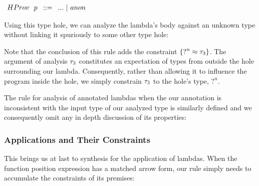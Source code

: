 \begin{center}
    $\arraycolsep=4pt\begin{array}{lll}
    HProv~~ p & ::= & 
        ... ~\vert~ 
        anon
        \\
    \end{array}$
\end{center}
Using this type hole, we can analyze the lambda's body against an unknown type without linking it spuriously to some other type hole:

\begin{mathpar}
\end{mathpar}
Note that the conclusion of this rule adds the constraint $\{ \TUnknown^{n} \approx \TMV_3 \}$. The argument of analysis $\TMV_3$ constitutes an expectation of types from outside the hole surrounding our lambda. Consequently, rather than allowing it to influence the program inside the hole, we simply constrain $\TMV_3$ to the hole's type, $?^n$.

The rule for analysis of annotated lambdas when the our annotation is inconsistent with the input type of our analyzed type is similarly defined and we consequently omit any in depth discussion of its properties:

\begin{mathpar}
\end{mathpar}

\subsubsection{Applications and Their Constraints}
This brings us at last to synthesis for the application of lambdas. When the function position expression has a matched arrow form, our rule simply needs to accumulate the constraints of its premises:

